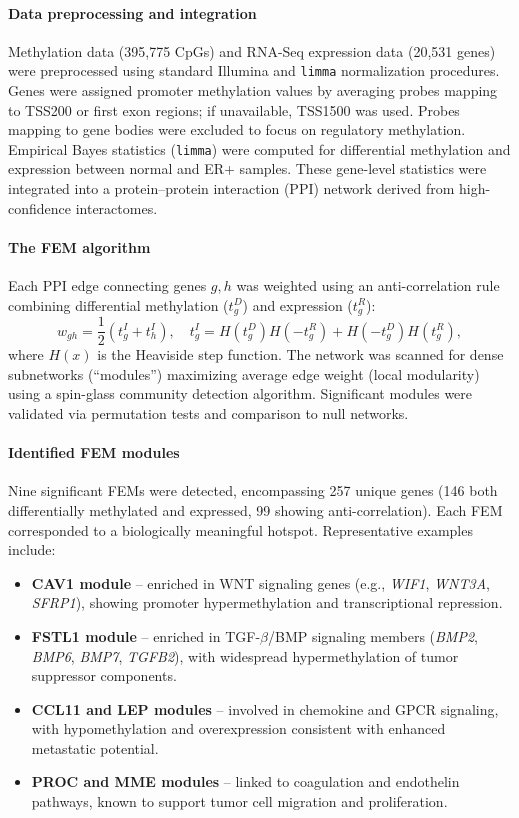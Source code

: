 \documentclass[10pt]{extarticle}
\begin{document}
\paragraph{Data preprocessing and integration}
Methylation data (395,775 CpGs) and RNA-Seq expression data (20,531 genes) were preprocessed using standard Illumina and \texttt{limma} normalization procedures. Genes were assigned promoter methylation values by averaging probes mapping to TSS200 or first exon regions; if unavailable, TSS1500 was used. Probes mapping to gene bodies were excluded to focus on regulatory methylation. Empirical Bayes statistics (\texttt{limma}) were computed for differential methylation and expression between normal and ER+ samples. These gene-level statistics were integrated into a protein–protein interaction (PPI) network derived from high-confidence interactomes.

\paragraph{The FEM algorithm}
Each PPI edge connecting genes \( g, h \) was weighted using an anti-correlation rule combining differential methylation (\( t^D_g \)) and expression (\( t^R_g \)):
\[
w_{gh} = \frac{1}{2} \left( t^I_g + t^I_h \right), \quad 
t^I_g = H(t^D_g)H(-t^R_g) + H(-t^D_g)H(t^R_g),
\]
where \(H(x)\) is the Heaviside step function.
The network was scanned for dense subnetworks (“modules”) maximizing average edge weight (local modularity) using a spin-glass community detection algorithm. Significant modules were validated via permutation tests and comparison to null networks.

\paragraph{Identified FEM modules}
Nine significant FEMs were detected, encompassing 257 unique genes (146 both differentially methylated and expressed, 99 showing anti-correlation). Each FEM corresponded to a biologically meaningful hotspot. Representative examples include:
\begin{itemize}[label=-]
\item \textbf{CAV1 module} – enriched in WNT signaling genes (e.g., \textit{WIF1}, \textit{WNT3A}, \textit{SFRP1}), showing promoter hypermethylation and transcriptional repression.
\item \textbf{FSTL1 module} – enriched in TGF-$\beta$/BMP signaling members (\textit{BMP2}, \textit{BMP6}, \textit{BMP7}, \textit{TGFB2}), with widespread hypermethylation of tumor suppressor components.
\item \textbf{CCL11 and LEP modules} – involved in chemokine and GPCR signaling, with hypomethylation and overexpression consistent with enhanced metastatic potential.
\item \textbf{PROC and MME modules} – linked to coagulation and endothelin pathways, known to support tumor cell migration and proliferation.
\end{itemize}
\end{document}
